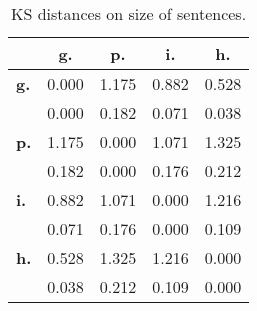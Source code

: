 \begin{table}[h!]
\begin{center}
\begin{tabular}{| l || c | c | c | c |}\hline
 & {\bf g.} & {\bf p.} & {\bf i.} & {\bf h.} \\\hline\hline
{\bf g.} & 0.000 & 1.175 & 0.882 & 0.528 \\
{\bf } & 0.000 & 0.182 & 0.071 & 0.038 \\\hline
{\bf p.} & 1.175 & 0.000 & 1.071 & 1.325 \\
{\bf } & 0.182 & 0.000 & 0.176 & 0.212 \\\hline
{\bf i.} & 0.882 & 1.071 & 0.000 & 1.216 \\
{\bf } & 0.071 & 0.176 & 0.000 & 0.109 \\\hline
{\bf h.} & 0.528 & 1.325 & 1.216 & 0.000 \\
{\bf } & 0.038 & 0.212 & 0.109 & 0.000 \\\hline
\end{tabular}
\caption{KS distances on size of sentences.}
\end{center}
\end{table}